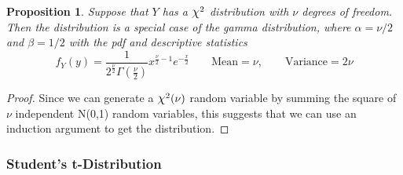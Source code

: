 \documentclass[12pt]{article}
\theoremstyle{plain}
\newtheorem{prop}[thm]{Proposition}
\theoremstyle{definition}
\theoremstyle{remark}
\newcommand*{\Chi}{\mbox{\large$\chi$}} %
\begin{document}
\begin{prop}
Suppose that $Y$ has a $\Chi^2$ distribution with $\nu$ degrees of
freedom. Then the distribution is a special case of the gamma
distribution, where $\alpha = \nu/2$ and $\beta = 1/2$ with the pdf and
descriptive statistics
\begin{equation}
   f_Y(y) = \frac{1}{2^{\frac{\nu}{2}} \Gamma\left(\frac{\nu}{2}\right)}
      x^{\frac{\nu}{2} - 1} e^{-\frac{x}{2}} \qquad
\text{Mean} = \nu, \qquad \text{Variance} = 2 \nu
\end{equation}
\end{prop}
\begin{proof}
Since we can generate a $\Chi^2(\nu)$ random variable by summing the
square of $\nu$ independent N(0,1) random variables, this suggests that
we can use an induction argument to get the distribution.
\end{proof}

\subsubsection{Student's t-Distribution}
\end{document}
